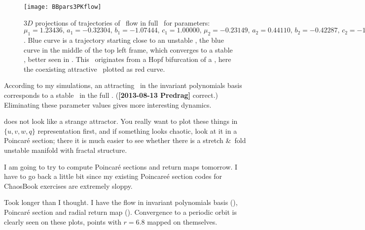 \begin{description}


\begin{figure}%
  \begin{center}
  \texttt{[image: BBpars3PKflow]}
  \end{center}
  \caption{$3D$ projections of trajectories of \twomode\ flow in full
  \statesp\ for parameters: $\mu_1 = 1.23436,\, a_1=-0.32304,\,
  b_1=-1.07444,\, c_1=1.00000,\, \mu_2=-0.23149,\, a_2=0.44110,\,
  b_2=-0.42287,\, c_2=-1.00000,\, e_2=0.67556$. Blue curve is a
  trajectory starting close to an unstable \reqv, the blue curve in the
  middle of the top left frame, which converges to a stable \rpo, better
  seen in . This \rpo\ originates from a Hopf
  bifurcation of a \reqv, here the coexisting attractive \reqv\ plotted
  as red curve.
  }
  \label{fig:BBpars3PKflow}
\end{figure}

\item[2013-08-08  Burak]
According to my simulations, an attracting \eqv\ in the invariant
polynomials basis corresponds to a stable \reqv\ in the full \statesp.
({\bf [2013-08-13 Predrag]} correct.)
Eliminating these parameter values
gives more interesting dynamics.

\item[2013-08-13 Predrag]  does not look like a
strange attractor. You really want to plot these things in $\{u,v,w,q\}$
representation first, and if something looks chaotic, look at it in a
Poincar\'e section; there it is much easier to see whether there is a
stretch \&\ fold unstable manifold with fractal structure.

\item[2013-08-14 Burak] I am going to try to compute Poincar\'e
sections and return maps tomorrow. I have to go back a little bit
since my existing Poincare\'e section codes for ChaosBook exercises
are extremely sloppy.


\item[2013-08-19 Burak] Took longer than I thought. I have the
\twomode flow in invariant polynomials basis
(), Poincar\'e section and radial
return map (). Convergence to a
periodic orbit is clearly seen on these plots, points with $r=6.8$
mapped on themselves.



\end{description}
